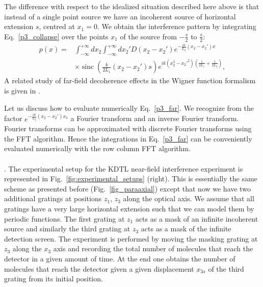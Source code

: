 \documentclass[12pt,groupedaddress,pra,aps]{revtex4-1}
\DeclareMathOperator\sinc{sinc}
\begin{document}
The difference with respect to the idealized situation described here above is that instead of a single point source we have an incoherent source of horizontal extension $s$, centred at  $x_1=0$. We obtain the interference pattern by integrating Eq.~\eqref{p3_collapse} over the points $x_1$ of the source from $-\frac{s}{2}$ to $\frac{s}{2}$:
\begin{equation}\label{p3_far}
\begin{split}
p(x)=&\int_{-\infty}^{+\infty} dx_2\int_{-\infty}^{+\infty}  dx_2' 
  D(x_2-x_2') e^{-\frac{ik}{L_2}(x_2-x_2')x}\\ 
  &\times \sinc \left(\frac{k}{2L_1}(x_2-x_2')s \right) e^{ik(x_2^2-x_2'^2)(\frac{1}{2L_1}+\frac{1}{2L_2})},
\end{split}
\end{equation}
A related study of far-field decoherence effects in the Wigner function formalism is given in \cite{PhysRevA.73.052102}.

Let us discuss how to evaluate numerically Eq.~\eqref{p3_far}. We recognize from the factor $e^{-\frac{ik}{L_2}(x_2-x_2')x_3}$  a Fourier transform and an inverse Fourier transform. Fourier transforms can be approximated with discrete Fourier transforms using the FFT algorithm. Hence the integrations in Eq.~\eqref{p3_far} can be conveniently  evaluated numerically with the row column FFT algorithm. \\ \\

.
The experimental setup for the KDTL near-field interference experiment is represented in Fig.~\ref{fig:experimental_setups} (right). This is essentially the same scheme as presented before (Fig.~\ref{fig_paraaxial}) except that now we have two additional gratings at positions $z_1$, $z_3$ along the optical axis. We assume that all gratings have a very large horizontal extension such that we can model them by  periodic functions. The first grating at $z_1$ acts as a mask of an infinite incoherent source and similarly the third grating at $z_3$ acts as a mask of the infinite detection screen. The experiment is performed by moving the masking grating at $z_3$ along the $x_3$ axis and recording the total number of molecules that reach the detector in a given amount of time. At the end one obtains the number of molecules that reach the detector given a given displacement $x_{3s}$ of the third grating from its initial position. 
\end{document}
